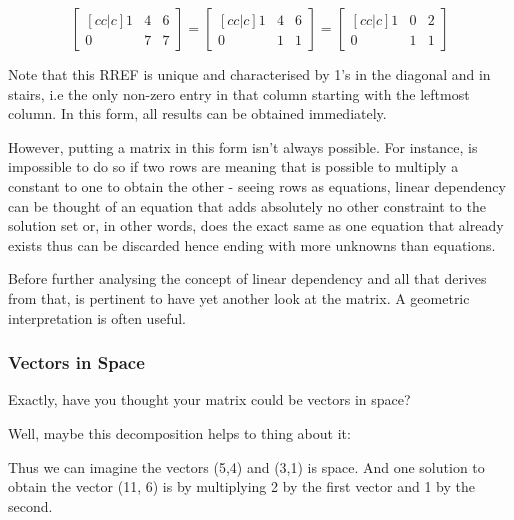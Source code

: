 \begin{equation}\label{eq:rref}
    \begin{bmatrix}[cc|c]
        1 & 4 & 6\\
        0 & 7 & 7
    \end{bmatrix}
    = 
    \begin{bmatrix}[cc|c]
        1 & 4 & 6\\
        0 & 1 & 1
    \end{bmatrix}
    =
    \begin{bmatrix}[cc|c]
        1 & 0 & 2\\
        0 & 1 & 1
    \end{bmatrix}
\end{equation}


\par Note that this RREF is unique and characterised by 1's in the diagonal and in stairs, i.e the only non-zero entry in that column starting with the leftmost column. In this form, all results can be obtained immediately.
\par However, putting a matrix in this form isn't always possible. For instance, is impossible to do so if two rows are  meaning that is possible to multiply a constant to one to obtain the other - seeing rows as equations, linear dependency can be thought of an equation that adds absolutely no other constraint to the solution set or, in other words, does the exact same as one equation that already exists thus can be discarded hence ending with more unknowns than equations.

\par Before further analysing the concept of linear dependency and all that derives from that, is pertinent to have yet another look at the matrix. A geometric interpretation is often useful.

\subsubsection{Vectors in Space}
\par Exactly, have you thought your matrix could be vectors in space?
\par Well, maybe this decomposition helps to thing about it:


\par Thus we can imagine the vectors (5,4) and (3,1) is space. And one solution to obtain the vector (11, 6) is by multiplying 2 by the first vector and 1 by the second.

